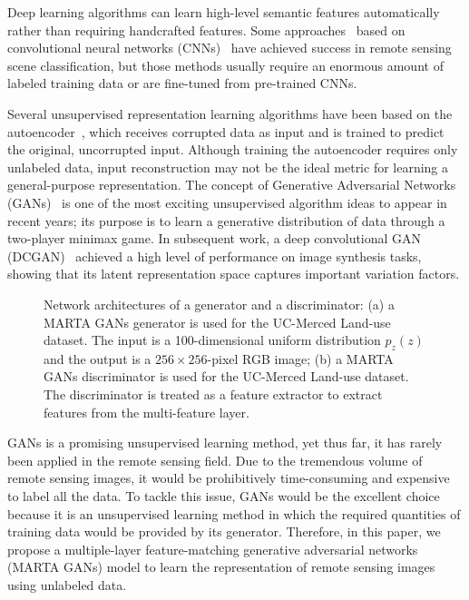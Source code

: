 \documentclass[journal]{IEEEtran}
\begin{document}
Deep learning algorithms
 can learn high-level semantic features automatically rather than requiring handcrafted features. Some approaches~\cite{penatti2015deep,nogueira2017towards} based on convolutional neural networks (CNNs)~\cite{krizhevsky2012imagenet} have achieved success in remote sensing scene classification, but those methods usually require an enormous amount of labeled training data or are fine-tuned from pre-trained CNNs.

Several unsupervised representation learning algorithms have been based on the autoencoder~\cite{vincent2010stacked, makhzani2013k}, which receives corrupted data as input and is trained to predict the original, uncorrupted input. Although training the autoencoder requires only unlabeled data, input reconstruction may not be the ideal metric for learning a general-purpose representation. The concept of Generative Adversarial Networks (GANs)~\cite{Goodfellow2014} is one of the most exciting unsupervised algorithm ideas to appear in recent years; its purpose is to learn a generative distribution of data through a two-player minimax game. In subsequent work, a deep convolutional GAN (DCGAN)~\cite{Radford2015} achieved a high level of performance on image synthesis tasks, showing that its latent representation space captures important variation factors.

\begin{figure*}[t]
	\centering
	\hfill
		
	\caption{Network architectures of a generator and a discriminator: (a) a MARTA GANs generator is used for the UC-Merced Land-use dataset. The input is a 100-dimensional uniform distribution $p_z(z)$ and the output is a $256 \times 256$-pixel RGB image; (b) a MARTA GANs discriminator is used for the UC-Merced Land-use dataset. The discriminator is treated as a feature extractor to extract features from the multi-feature layer.}
	\label{model} 
	\vspace{-4mm}
\end{figure*}

GANs is a promising unsupervised learning method, yet thus far, it has rarely been applied in the remote sensing field. Due to the tremendous volume of remote sensing images, it would be prohibitively time-consuming and expensive to label all the data. To tackle this issue, GANs would be the excellent choice because it is an unsupervised learning method in which the required quantities of training data would be provided by its generator. Therefore, in this paper, we propose a multiple-layer feature-matching generative adversarial networks 
(MARTA GANs) model to learn the representation of remote sensing images using unlabeled data.
\end{document}

